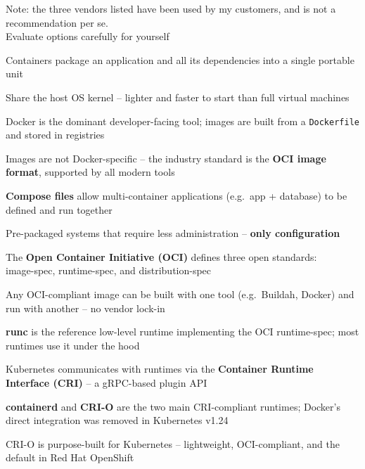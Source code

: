 \documentclass[Screen16to9,17pt]{foils}
\begin{document}
Note: the three vendors listed have been used by my customers, and is not a recommendation per se.\\ Evaluate options carefully for yourself




\begin{list2}
\item Containers package an application and all its dependencies into a single portable unit
\item Share the host OS kernel -- lighter and faster to start than full virtual machines
\item Docker is the dominant developer-facing tool; images are built from a \verb+Dockerfile+ and stored in registries
\item Images are not Docker-specific -- the industry standard is the {\bf OCI image format}, supported by all modern tools
\item {\bf Compose files} allow multi-container applications (e.g.\ app + database) to be defined and run together
\item Pre-packaged systems that require less administration -- {\bf only configuration}
\end{list2}



\begin{list2}
\item The {\bf Open Container Initiative (OCI)} defines three open standards:\\
image-spec, runtime-spec, and distribution-spec 
\item Any OCI-compliant image can be built with one tool (e.g.\ Buildah, Docker) and run with another -- no vendor lock-in
\item {\bf runc} is the reference low-level runtime implementing the OCI runtime-spec; most runtimes use it under the hood
\item Kubernetes communicates with runtimes via the {\bf Container Runtime Interface (CRI)} -- a gRPC-based plugin API
\item {\bf containerd} and {\bf CRI-O} are the two main CRI-compliant runtimes; Docker's direct integration was removed in Kubernetes v1.24 
\item CRI-O is purpose-built for Kubernetes -- lightweight, OCI-compliant, and the default in Red Hat OpenShift 
\end{list2}
\end{document}
